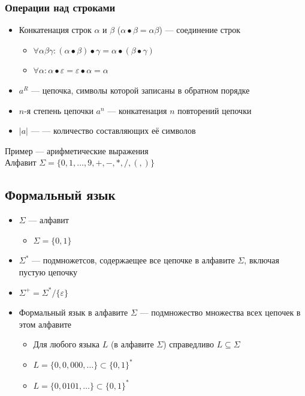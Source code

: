 \documentclass[a4paper, 14pt]{extarticle}
\begin{document}
\subsubsection*{Операции над строками}
\begin{itemize}
    \item Конкатенация строк $\alpha$ и $\beta$ ($ \alpha \bullet \beta = \alpha\beta $) --- соединение строк
    \begin{itemize}
        \item $ \forall \alpha\beta\gamma: (\alpha \bullet \beta) \bullet \gamma = \alpha \bullet (\beta \bullet \gamma) $
        \item $ \forall \alpha: \alpha \bullet \varepsilon = \varepsilon \bullet \alpha = \alpha $
    \end{itemize}
    \item {} $a^R$ --- цепочка, символы которой записаны в обратном порядке
    \item $n$-я степень цепочки $a^n$ --- конкатенация $n$ повторений цепочки
    \item $|a|$ ---  --- количество составляющих её символов
\end{itemize}

Пример --- арифметические выражения\\
Алфавит $\Sigma = \{0, 1, \ldots, 9, +, -, *, /, (, )\}$

\subsection{Формальный язык}
\begin{itemize}
    \item $\Sigma$ --- алфавит
        \begin{itemize}
            \item $\Sigma = \{0, 1\}$
        \end{itemize}
    \item $\Sigma^*$ --- подмножетсов, содержаещее все цепочке в алфавите $\Sigma$, включая пустую цепочку
    \item $\Sigma^+ = \Sigma^* / \{\varepsilon \} $
    \item Формальный язык в алфавите $\Sigma$ --- подмножество множества всех цепочек в этом алфавите
    \begin{itemize}
        \item Для любого языка $L$ (в алфавите $\Sigma$) справедливо $L\subseteq \Sigma $
    \item $L = \{0, 0, 000, \ldots \} \subset {\{0,1\}}^*$
    \item $L = \{ 0, 0101, \ldots \} \subset {\{ 0, 1 \}}^*$
    \end{itemize}
\end{itemize}
\end{document}
